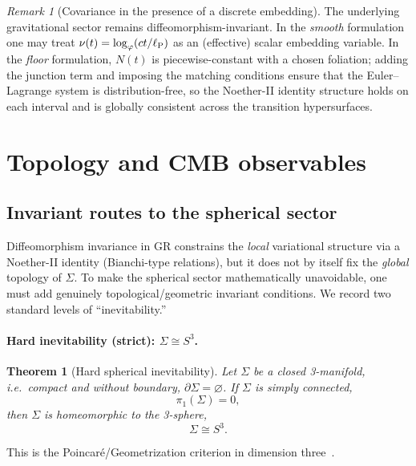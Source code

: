 \documentclass[
  reprint,
  amsmath,amssymb,
  aps,
  prd,
  superscriptaddress,
  nofootinbib,
  longbibliography
]{revtex4-2}
\newcommand{\phig}{\varphi}
\newcommand{\Sthree}{S^{3}}
\newcommand{\ellP}{\ell_{\rm P}}
\newcommand{\Sig}{\Sigma}
\newtheorem{theorem}{Theorem}
\theoremstyle{definition}
\theoremstyle{remark}
\newtheorem{remark}{Remark}
\begin{document}
\begin{remark}[Covariance in the presence of a discrete embedding]
The underlying gravitational sector remains diffeomorphism-invariant. In the \emph{smooth} formulation one may treat
$\nu(t)=\log_{\phig}(ct/\ellP)$ as an (effective) scalar embedding variable. In the \emph{floor} formulation, $N(t)$ is
piecewise-constant with a chosen foliation; adding the junction term and imposing the matching conditions ensure that the
Euler--Lagrange system is distribution-free, so the Noether-II identity structure holds on each interval and is globally
consistent across the transition hypersurfaces.
\end{remark}


\section{Topology and CMB observables}

\subsection{Invariant routes to the spherical sector}
\label{sec:invariant_routes_s3}
Diffeomorphism invariance in GR constrains the \emph{local} variational structure via a Noether-II identity
(Bianchi-type relations), but it does not by itself fix the \emph{global} topology of $\Sig$.
To make the spherical sector mathematically unavoidable, one must add genuinely
topological/geometric invariant conditions. We record two standard levels of ``inevitability.''

\paragraph{Hard inevitability (strict): $\Sig\cong \Sthree$.}
\begin{theorem}[Hard spherical inevitability]
\label{thm:hard_s3_main}
Let $\Sig$ be a closed 3-manifold, i.e.\ compact and without boundary, $\partial\Sig=\varnothing$.
If $\Sig$ is simply connected,
\begin{equation}
\pi_1(\Sig)=0,
\end{equation}
then $\Sig$ is homeomorphic to the 3-sphere,
\begin{equation}
\Sig \cong \Sthree.
\end{equation}
\end{theorem}
This is the Poincar\'e/Geometrization criterion in dimension three~\cite{Perelman2002Entropy,Perelman2003Surgery,Perelman2003Extinction,MorganTian2007RicciFlowPoincare,KleinerLott2008NotesPerelman}.
\end{document}
